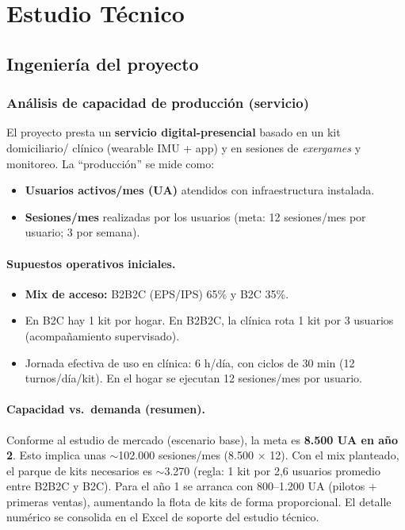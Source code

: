 \section{Estudio Técnico}

\subsection{Ingeniería del proyecto}

\subsubsection{Análisis de capacidad de producción (servicio)}
El proyecto presta un \textbf{servicio digital-presencial} basado en un kit domiciliario/ clínico (wearable IMU + app) y en sesiones de \emph{exergames} y monitoreo. La “producción” se mide como:
\begin{itemize}
    \item \textbf{Usuarios activos/mes (UA)} atendidos con infraestructura instalada.
    \item \textbf{Sesiones/mes} realizadas por los usuarios (meta: 12 sesiones/mes por usuario; 3 por semana).
\end{itemize}

\paragraph{Supuestos operativos iniciales.}
\begin{itemize}
    \item \textbf{Mix de acceso:} B2B2C (EPS/IPS) 65\% y B2C 35\%.
    \item En B2C hay 1 kit por hogar. En B2B2C, la clínica rota 1 kit por 3 usuarios (acompañamiento supervisado).
    \item Jornada efectiva de uso en clínica: 6 h/día, con ciclos de 30 min (12 turnos/día/kit). En el hogar se ejecutan 12 sesiones/mes por usuario.
\end{itemize}

\paragraph{Capacidad vs.\ demanda (resumen).}
Conforme al estudio de mercado (escenario base), la meta es \textbf{8.500 UA en año 2}. Esto implica unas $\sim$102.000 sesiones/mes (8.500 $\times$ 12). Con el mix planteado, el parque de kits necesarios es $\sim$3.270 (regla: 1 kit por 2,6 usuarios promedio entre B2B2C y B2C). Para el año 1 se arranca con 800--1.200 UA (pilotos + primeras ventas), aumentando la flota de kits de forma proporcional. El detalle numérico se consolida en el Excel de soporte del estudio técnico.

